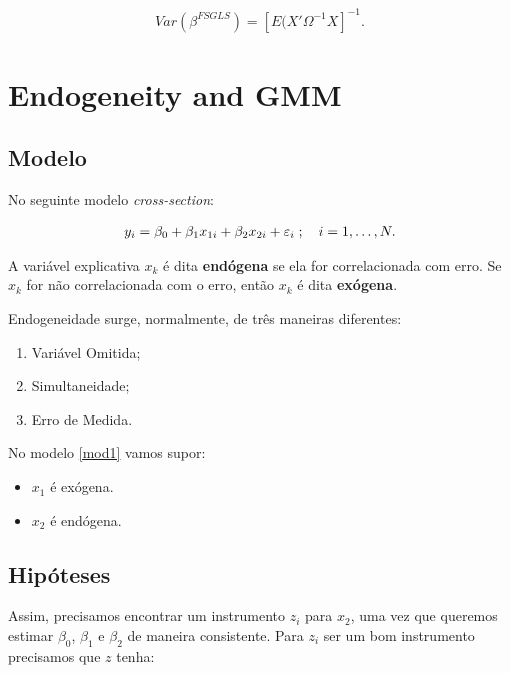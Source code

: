 \documentclass[11pt,oneside,a4paper]{article}
\numberwithin{equation}{section}
\begin{document}
\vspace{-1.5 em}
\begin{align*}
	Var(\beta^{FSGLS}) = \left[ E(X' \Omega^{-1} X \right]^{-1}.
\end{align*}

\clearpage
\section{Endogeneity and GMM}


\subsection*{Modelo}

No seguinte modelo \textit{cross-section}:

\vspace{-1 em}
\begin{align} \label{mod1}
	y_{i} = \beta_{0} + \beta_{1} x_{1i} + \beta_{2} x_{2i} + \varepsilon_{i}
	\; ; \quad i = 1, \dots, N.
\end{align}

\noindent
A variável explicativa $x_{k}$ é dita \textbf{endógena} se ela for correlacionada com erro.
Se $x_{k}$ for não correlacionada com o erro, então $x_{k}$ é dita \textbf{exógena}.

Endogeneidade surge, normalmente, de três maneiras diferentes:

\begin{enumerate}\itemsep0pt
	\item Variável Omitida;
	\item Simultaneidade;
	\item Erro de Medida.
\end{enumerate}

No modelo \eqref{mod1} vamos supor:

\begin{itemize}\itemsep0pt
	\item $x_{1}$ é exógena.
	\item $x_{2}$ é endógena.
\end{itemize}

\subsection*{Hipóteses}

Assim, precisamos encontrar um instrumento $z_{i}$ para $x_{2}$, uma vez que queremos estimar $\beta_{0}$, $\beta_{1}$ e $\beta_{2}$ de maneira consistente.
Para $z_{i}$ ser um bom instrumento precisamos que $z$ tenha:
\end{document}
